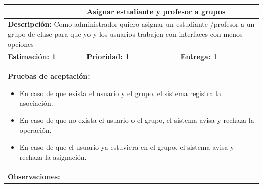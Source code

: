 \begin{table}[H]
\centering
{}
\begin{tabularx}{\textwidth}{|X|X|X|}
\hline
\rowcolor{azulclaro}
\multicolumn{1}{|l|}{\textbf{Identificador:} HU-A4} & \multicolumn{2}{l|}{\textbf{Asignar estudiante y profesor a grupos}} \\ \hline
\multicolumn{3}{|p{\dimexpr\textwidth-2\tabcolsep-2\arrayrulewidth}|}{\textbf{Descripción:} Como administrador quiero asignar un estudiante /profesor a un grupo de clase para que yo y los usuarios trabajen con interfaces con menos opciones} \\ \hline
\rowcolor{white}
\textbf{Estimación: 1} & \textbf{Prioridad: 1} & \textbf{Entrega: 1} \\ \hline
\multicolumn{3}{|p{\dimexpr\textwidth-2\tabcolsep-2\arrayrulewidth}|}{%
\textbf{Pruebas de aceptación:}
\begin{itemize}[leftmargin=1.5em, itemsep=2pt, topsep=3pt]
    \item En caso de que exista el usuario y el grupo, el sistema registra la asociación.
    \item En caso de que no exista el usuario o el grupo, el sistema avisa y rechaza la operación.
    \item En caso de que el usuario ya estuviera en el grupo, el sistema avisa y rechaza la asignación.
\end{itemize}
} \\ \hline
\multicolumn{3}{|p{\dimexpr\textwidth-2\tabcolsep-2\arrayrulewidth}|}{\textbf{Observaciones:}} \\ \hline
\end{tabularx}
\end{table}

\vspace{0.4cm}

